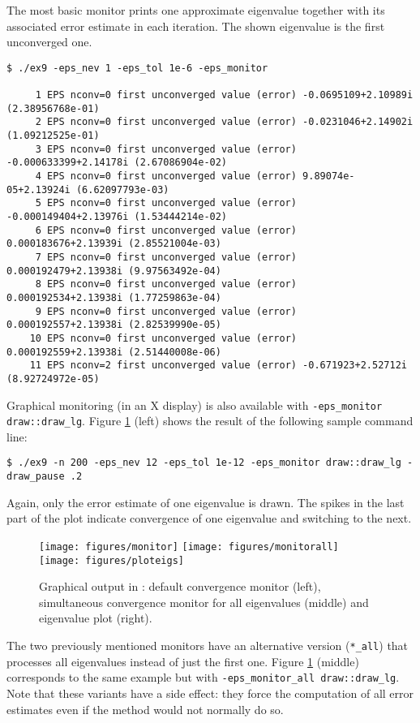 The most basic monitor prints one approximate eigenvalue together with its associated error estimate in each iteration. The shown eigenvalue is the first unconverged one.
\begin{Verbatim}[fontsize=\footnotesize,numbers=none]
   $ ./ex9 -eps_nev 1 -eps_tol 1e-6 -eps_monitor

     1 EPS nconv=0 first unconverged value (error) -0.0695109+2.10989i (2.38956768e-01)
     2 EPS nconv=0 first unconverged value (error) -0.0231046+2.14902i (1.09212525e-01)
     3 EPS nconv=0 first unconverged value (error) -0.000633399+2.14178i (2.67086904e-02)
     4 EPS nconv=0 first unconverged value (error) 9.89074e-05+2.13924i (6.62097793e-03)
     5 EPS nconv=0 first unconverged value (error) -0.000149404+2.13976i (1.53444214e-02)
     6 EPS nconv=0 first unconverged value (error) 0.000183676+2.13939i (2.85521004e-03)
     7 EPS nconv=0 first unconverged value (error) 0.000192479+2.13938i (9.97563492e-04)
     8 EPS nconv=0 first unconverged value (error) 0.000192534+2.13938i (1.77259863e-04)
     9 EPS nconv=0 first unconverged value (error) 0.000192557+2.13938i (2.82539990e-05)
    10 EPS nconv=0 first unconverged value (error) 0.000192559+2.13938i (2.51440008e-06)
    11 EPS nconv=2 first unconverged value (error) -0.671923+2.52712i (8.92724972e-05)
\end{Verbatim}

Graphical monitoring (in an X display) is also available with \Verb!-eps_monitor draw::draw_lg!. Figure \ref{fig:plot} (left) shows the result of the following sample command line:
\begin{Verbatim}[fontsize=\footnotesize,numbers=none]
   $ ./ex9 -n 200 -eps_nev 12 -eps_tol 1e-12 -eps_monitor draw::draw_lg -draw_pause .2
\end{Verbatim}
Again, only the error estimate of one eigenvalue is drawn. The spikes in the last part of the plot indicate convergence of one eigenvalue and switching to the next.

\begin{figure}
  \texttt{[image: figures/monitor]}
  \hfill
  \texttt{[image: figures/monitorall]}
  \hfill
  \texttt{[image: figures/ploteigs]}
  \caption{\label{fig:plot}Graphical output in \slepc: default convergence monitor (left), simultaneous convergence monitor for all eigenvalues (middle) and eigenvalue plot (right).}
\end{figure}

The two previously mentioned monitors have an alternative version (\Verb!*_all!) that processes all eigenvalues instead of just the first one. Figure \ref{fig:plot} (middle) corresponds to the same example but with \Verb!-eps_monitor_all draw::draw_lg!. Note that these variants have a side effect: they force the computation of all error estimates even if the method would not normally do so.

